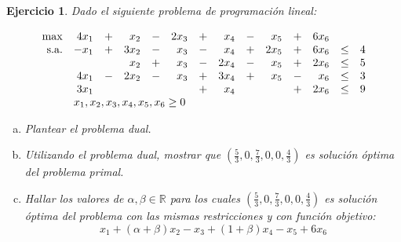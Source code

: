 \documentclass[a4paper,oneside,12pt]{amsart}
\newtheorem{quest}{Ejercicio}
\begin{document}



\begin{quest} 
Dado el siguiente problema de programación lineal:

\[\begin{array}{rrrrrrrrrrrrrr}
    \max & 4x_1 & + & x_2 & - & 2x_3 & + & x_4 & - & x_5 & + & 6x_6 & & \\
    \text{s.a.} & -x_1 & + & 3x_2 & - & x_3 & - & x_4 & + & 2x_5 & + & 6x_6 & \leq & 4 \\
    &  &  & x_2 & + & x_3 & - & 2x_4 & - & x_5 & + & 2x_6 & \leq & 5 \\
    & 4x_1 & - & 2x_2 & - & x_3 & + & 3x_4 & + & x_5 & - & x_6 & \leq & 3 \\
    & 3x_1 &  &  &  &  & + & x_4 &  &  & + & 2x_6 & \leq & 9 \\
    & \multicolumn{13}{l}{x_1,x_2,x_3,x_4,x_5,x_6\geq 0}
\end{array}
\]

\begin{enumerate}[a)]
    \item Plantear el problema dual.
    \item Utilizando el problema dual, mostrar que $(\frac{5}{3}, 0, \frac{7}{3}, 0, 0, \frac{4}{3})$ es solución óptima del problema primal.
    \item Hallar los valores de $\alpha,\beta\in \mathbb{R}$ para los cuales $(\frac{5}{3}, 0, \frac{7}{3}, 0, 0, \frac{4}{3})$ es solución óptima del problema con las mismas restricciones y con función objetivo: \[x_1  + (\alpha + \beta) x_2 - x_3 + (1+\beta)x_4 - x_5 + 6x_6\]
\end{enumerate}
\end{quest}


\end{document}

